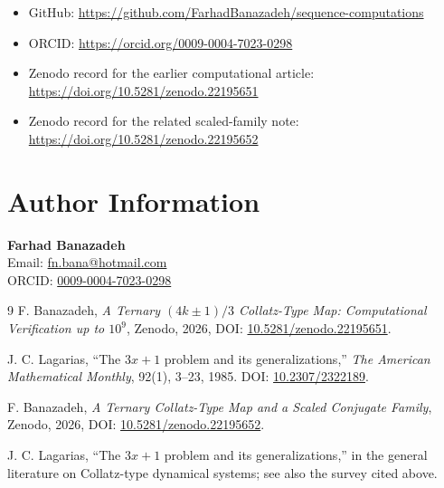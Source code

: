 \documentclass[11pt]{article}
\begin{document}
\begin{itemize}
\item GitHub: \url{https://github.com/FarhadBanazadeh/sequence-computations}
\item ORCID: \url{https://orcid.org/0009-0004-7023-0298}
\item Zenodo record for the earlier computational article: \url{https://doi.org/10.5281/zenodo.22195651}
\item Zenodo record for the related scaled-family note: \url{https://doi.org/10.5281/zenodo.22195652}
\end{itemize}

\section*{Author Information}
\textbf{Farhad Banazadeh}\\
Email: \href{mailto:fn.bana@hotmail.com}{fn.bana@hotmail.com}\\
ORCID: \href{https://orcid.org/0009-0004-7023-0298}{0009-0004-7023-0298}

\begin{thebibliography}{9}
F. Banazadeh, \emph{A Ternary $(4k\pm1)/3$ Collatz-Type Map: Computational Verification up to $10^9$}, Zenodo, 2026, DOI: \href{https://doi.org/10.5281/zenodo.22195651}{10.5281/zenodo.22195651}.

J. C. Lagarias, ``The $3x+1$ problem and its generalizations,'' \emph{The American Mathematical Monthly}, 92(1), 3--23, 1985. DOI: \href{https://doi.org/10.2307/2322189}{10.2307/2322189}.

F. Banazadeh, \emph{A Ternary Collatz-Type Map and a Scaled Conjugate Family}, Zenodo, 2026, DOI: \href{https://doi.org/10.5281/zenodo.22195652}{10.5281/zenodo.22195652}.

J. C. Lagarias, ``The $3x+1$ problem and its generalizations,'' in the general literature on Collatz-type dynamical systems; see also the survey cited above.
\end{thebibliography}
\end{document}
